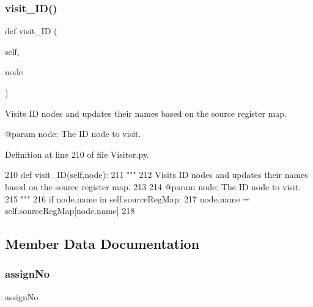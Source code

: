 \subsubsection{\texorpdfstring{visit\+\_\+\+I\+D()}{visit\_ID()}}
{\footnotesize\ttfamily def visit\+\_\+\+ID (\begin{DoxyParamCaption}\item[{}]{self,  }\item[{}]{node }\end{DoxyParamCaption})}

\begin{DoxyVerb}Visits ID nodes and updates their names based on the source register map.

@param node: The ID node to visit.
\end{DoxyVerb}
 

Definition at line 210 of file Visitor.\+py.


\begin{DoxyCode}
210     \textcolor{keyword}{def }visit\_ID(self,node):
211         \textcolor{stringliteral}{"""
}
212 \textcolor{stringliteral}{        Visits ID nodes and updates their names based on the source register map.
}
213 \textcolor{stringliteral}{
}
214 \textcolor{stringliteral}{        @param node: The ID node to visit.
}
215 \textcolor{stringliteral}{        """}
216         \textcolor{keywordflow}{if} node.name \textcolor{keywordflow}{in} self.sourceRegMap:
217             node.name = self.sourceRegMap[node.name]
218     
\end{DoxyCode}


\subsection{Member Data Documentation}
\mbox{\label{classPostProcessor_1_1Visitor_1_1SourceRegHandler_a58eaabd0374c4bb1e31a844d27cc020e}} 
\subsubsection{\texorpdfstring{assign\+No}{assignNo}}
{\footnotesize\ttfamily assign\+No}



